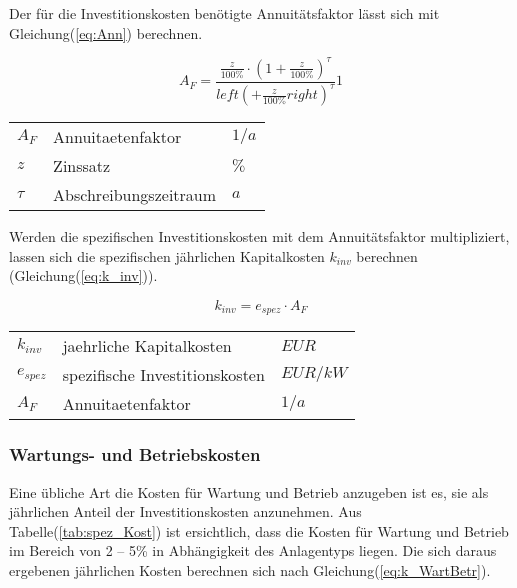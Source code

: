 \documentclass[onecolumn,10pt,titlepage]{article}
\begin{document}
				Der für die Investitionskosten benötigte Annuitätsfaktor lässt sich mit Gleichung(\ref{eq:Ann}) berechnen.\cite{Gluck.}
				
\begin{equation}
\label{eq:Ann}
	A_F=\frac{\frac{z}{100\%}\cdot\left(1+\frac{z}{100\%}\right)^{\tau}}{left(+\frac{z}{100\%}right)^{\tau}}1
\end{equation}
		
				\begin{table}[H]
					\begin{tabular*}{\textwidth}{lll}
						$A_F$&Annuitaetenfaktor&$1/a$\\
						$z$&Zinssatz&$\%$\\
						$\tau$&Abschreibungszeitraum&$a$\\
						
					\end{tabular*}
				\end{table} 
	
				Werden die spezifischen Investitionskosten mit dem Annuitätsfaktor multipliziert, lassen sich die spezifischen jährlichen Kapitalkosten $k_{inv}$ berechnen (Gleichung(\ref{eq:k_inv})).\cite{Hey.26.Oktober2012}
				
				\begin{equation}
				\label{eq:k_inv}
				k_{inv} = e_{spez} \cdot A_F
				\end{equation}
				
				\begin{table}[H]
					\begin{tabular*}{\textwidth}{lll}
						$k_{inv}$&jaehrliche Kapitalkosten&$EUR$\\
						$e_{spez}$&spezifische Investitionskosten&$EUR/kW$\\
						$A_F$&Annuitaetenfaktor&$1/a$\\
					\end{tabular*}
				\end{table}
					
				\subsubsection*{Wartungs- und Betriebskosten}
				Eine übliche Art die Kosten für Wartung und Betrieb anzugeben ist es, sie als jährlichen Anteil der Investitionskosten anzunehmen. Aus Tabelle(\ref{tab:spez_Kost}) ist ersichtlich, dass die Kosten für Wartung und Betrieb im Bereich von 2 – 5\% in Abhängigkeit des Anlagentyps liegen. Die sich daraus ergebenen jährlichen Kosten berechnen sich nach Gleichung(\ref{eq:k_WartBetr}).\cite{Hey.26.Oktober2012}
				
\end{document}
